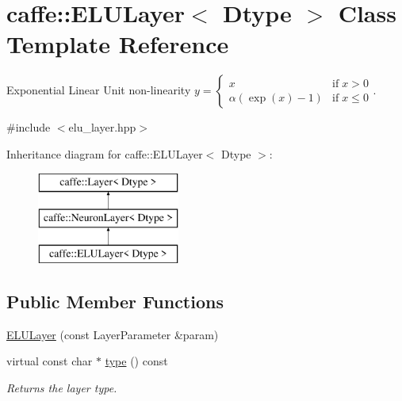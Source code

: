 \hypertarget{classcaffe_1_1ELULayer}{}\section{caffe\+:\+:E\+L\+U\+Layer$<$ Dtype $>$ Class Template Reference}
\label{classcaffe_1_1ELULayer}


Exponential Linear Unit non-\/linearity $ y = \left\{ \begin{array}{lr} x & \mathrm{if} \; x > 0 \\ \alpha (\exp(x)-1) & \mathrm{if} \; x \le 0 \end{array} \right. $.  




{\ttfamily \#include $<$elu\+\_\+layer.\+hpp$>$}

Inheritance diagram for caffe\+:\+:E\+L\+U\+Layer$<$ Dtype $>$\+:\begin{figure}[H]
\begin{center}
\leavevmode
\includegraphics[height=3.000000cm]{classcaffe_1_1ELULayer}
\end{center}
\end{figure}
\subsection*{Public Member Functions}
\begin{DoxyCompactItemize}
\item 
\hyperlink{classcaffe_1_1ELULayer_af0b475c3d3b68f6daf7e2edcb7d5b97a}{E\+L\+U\+Layer} (const Layer\+Parameter \&param)
\item 
virtual const char $\ast$ \hyperlink{classcaffe_1_1ELULayer_a873d1abfe75142b44bea0507bef51c03}{type} () const \hypertarget{classcaffe_1_1ELULayer_a873d1abfe75142b44bea0507bef51c03}{}\label{classcaffe_1_1ELULayer_a873d1abfe75142b44bea0507bef51c03}

\begin{DoxyCompactList}\small\item\em Returns the layer type. \end{DoxyCompactList}\end{DoxyCompactItemize}
